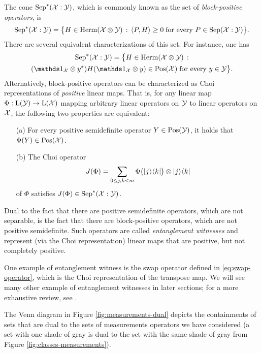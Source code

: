 The cone $\mathrm{Sep}^{\ast}(\mathcal{X} : \mathcal{Y})$, which is commonly known as the set of 
\emph{block-positive operators}, is
\begin{equation}
  \mathrm{Sep}^{\ast}(\mathcal{X}:\mathcal{Y}) = \bigl\{
  H\in\mathrm{Herm}(\mathcal{X}\otimes\mathcal{Y})\,:\,
  \langle P , H\rangle \geq 0 \;\text{for every $P \in \mathrm{Sep}(\mathcal{X}:\mathcal{Y})$}\bigr\}.
\end{equation}
There are several equivalent characterizations of this set.
For instance, one has
\begin{multline}
  \BPos(\X:\Y) = \bigl\{
  H\in\Herm(\X\otimes\Y)\,:\\
  (\I_{\X} \otimes y^{\ast}) H (\I_{\X} \otimes y)\in\Pos(\X)
  \;\text{for every $y\in\Y$}\bigr\}.
\end{multline}
Alternatively, block-positive operators can be characterized as Choi 
representations of \emph{positive} linear maps.
That is, for any linear map $\Phi:\mathrm{L}(\mathcal{Y})\rightarrow\mathrm{L}(\mathcal{X})$
mapping arbitrary linear operators on $\mathcal{Y}$ to linear operators on $\mathcal{X}$, the
following two properties are equivalent:
\begin{itemize}
\item[(a)] For every positive semidefinite operator $Y \in \mathrm{Pos}(\mathcal{Y})$, it 
holds that $\Phi(Y) \in \mathrm{Pos}(\mathcal{X})$. 
\item[(b)] The Choi operator
\begin{equation}
  J(\Phi) = \sum_{0\leq j,k< m} \Phi\bigl(\lvert\mspace{0.5mu} j \mspace{0.5mu} \rangle\langle\mspace{0.5mu} k \mspace{0.5mu} \rvert\bigr) 
  \otimes \lvert\mspace{0.5mu} j \mspace{0.5mu} \rangle\langle\mspace{0.5mu} k \mspace{0.5mu} \rvert
\end{equation}
of $\Phi$ satisfies $J(\Phi) \in \mathrm{Sep}^{\ast}(\mathcal{X}:\mathcal{Y})$.
\end{itemize}

Dual to the fact that there are positive semidefinite operators, which are not 
separable, is the fact that there are block-positive operators, which are not 
positive semidefinite. Such operators are called \emph{entanglement witnesses} 
and represent (via the Choi representation) linear maps that are positive, 
but not completely positive.

One example of entanglement witness is the swap operator defined in 
\eqref{eq:swap-operator}, which is the Choi representation
of the transpose map.
We will see many other example of entanglement witnesses in later sections;
for a more exhaustive review, see \cite{Chruscinski2014}.

The Venn diagram in Figure \ref{fig:measurements-dual} depicts the containments
of sets that are dual to the sets of measurements operators we have considered  
(a set with one shade of gray is dual to the set with the same shade of gray from
Figure \ref{fig:classes-measurements}).

